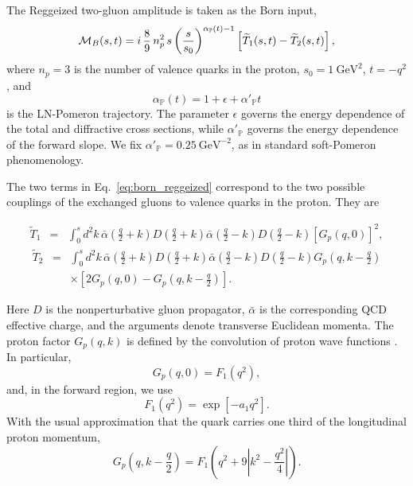 \documentclass[aps,prd,twocolumn,superscriptaddress,longbibliography,nofootinbib]{revtex4-2}
\newcommand{\GeV}{\mathrm{GeV}}
\begin{document}
The Reggeized two-gluon amplitude is taken as the Born input,
\begin{equation}
{\cal M}_B(s,t)
=
i\,\frac{8}{9}\,n_p^2\,
s\left(\frac{s}{s_0}\right)^{\alpha_{\mathbb P}(t)-1}
\left[\widetilde T_1(s,t)-\widetilde T_2(s,t)\right],
\label{eq:born_reggeized}
\end{equation}
where $n_p=3$ is the number of valence quarks in the proton, $s_0=1~\GeV^2$, $t=-q^2$, and
\begin{equation}
\alpha_{\mathbb P}(t)=1+\epsilon+\alpha'_{\mathbb P}t
\label{eq:pomeron_trajectory}
\end{equation}
is the LN-Pomeron trajectory.  The parameter $\epsilon$ governs the energy dependence of the total and diffractive cross sections, while $\alpha'_{\mathbb P}$ governs the energy dependence of the forward slope.  We fix $\alpha'_{\mathbb P}=0.25~\GeV^{-2}$, as in standard soft-Pomeron phenomenology.

The two terms in Eq.~\eqref{eq:born_reggeized} correspond to the two possible couplings of the exchanged gluons to valence quarks in the proton.  They are
\begin{widetext}
\begin{eqnarray}
\widetilde T_1
&=&
\int_0^s d^2k\,
\bar\alpha\left(\frac{q}{2}+k\right)
D\left(\frac{q}{2}+k\right)
\bar\alpha\left(\frac{q}{2}-k\right)
D\left(\frac{q}{2}-k\right)
\left[G_p(q,0)\right]^2,
\label{eq:t1}
\end{eqnarray}
\begin{eqnarray}
\widetilde T_2
&=&
\int_0^s d^2k\,
\bar\alpha\left(\frac{q}{2}+k\right)
D\left(\frac{q}{2}+k\right)
\bar\alpha\left(\frac{q}{2}-k\right)
D\left(\frac{q}{2}-k\right)
G_p\left(q,k-\frac{q}{2}\right)
\nonumber\\
&&\times
\left[
2G_p(q,0)-G_p\left(q,k-\frac{q}{2}\right)
\right].
\label{eq:t2}
\end{eqnarray}
\end{widetext}
Here $D$ is the nonperturbative gluon propagator, $\bar\alpha$ is the corresponding QCD effective charge, and the arguments denote transverse Euclidean momenta.  The proton factor $G_p(q,k)$ is defined by the convolution of proton wave functions \cite{BopsinEtAl2023,CudellRoss1991}.  In particular,
\begin{equation}
G_p(q,0)=F_1(q^2),
\label{eq:Gp_F1}
\end{equation}
and, in the forward region, we use
\begin{equation}
F_1(q^2)=\exp[-a_1q^2].
\label{eq:F1_param}
\end{equation}
With the usual approximation that the quark carries one third of the longitudinal proton momentum,
\begin{equation}
G_p\left(q,k-\frac{q}{2}\right)
=
F_1\left(q^2+9\left|k^2-\frac{q^2}{4}\right|\right).
\label{eq:Gp_approx}
\end{equation}
\end{document}
